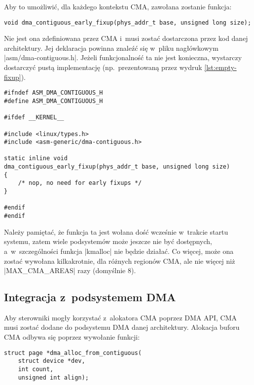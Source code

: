 Aby to umożliwić, dla każdego kontekstu CMA, zawołana zostanie funkcja:

\begin{lstlisting}
void dma_contiguous_early_fixup(phys_addr_t base, unsigned long size);
\end{lstlisting}

Nie jest ona zdefiniowana przez CMA i~musi zostać dostarczona przez
kod danej architektury.  Jej deklaracja powinna znaleźć się w~pliku
nagłówkowym \code|asm/dma-contiguous.h|.  Jeżeli funkcjonalność
ta nie jest konieczna, wystarczy dostarczyć pustą implementację
(np.\ prezentowaną przez wydruk \ref{lst:empty-fixup}).

\begin{lstlisting}[float=tbhp,caption={[Pusta implementacja funkcji
        \code|dma_contiguous_early_fixup|.]Plik nagłówkowy
      \code|asm/dma-contiguous.h| z~pustą implementacją funkcji
      \code|dma_contiguous_early_fixup|.},label=lst:empty-fixup]
#ifndef ASM_DMA_CONTIGUOUS_H
#define ASM_DMA_CONTIGUOUS_H

#ifdef __KERNEL__

#include <linux/types.h>
#include <asm-generic/dma-contiguous.h>

static inline void
dma_contiguous_early_fixup(phys_addr_t base, unsigned long size)
{
	/* nop, no need for early fixups */
}

#endif
#endif
\end{lstlisting}

Należy pamiętać, że funkcja ta jest wołana dość wcześnie w~trakcie
startu systemu, zatem wiele podsystemów może jeszcze nie być
dostępnych, a~w~szczególności funkcja \code|kmalloc| nie będzie
działać.  Co więcej, może ona zostać wywołana kilkakrotnie, dla
różnych regionów CMA, ale nie więcej niż \code|MAX_CMA_AREAS|
razy (domyślnie 8).

\subsection{Integracja z~podsystemem DMA}\label{sec:usage-integrate}

Aby sterowniki mogły korzystać z~alokatora CMA poprzez DMA API, CMA
musi zostać dodane do podsystemu DMA danej architektury.  Alokacja
buforu CMA odbywa się poprzez wywołanie funkcji:

\begin{lstlisting}
struct page *dma_alloc_from_contiguous(
	struct device *dev,
	int count,
	unsigned int align);
\end{lstlisting}

